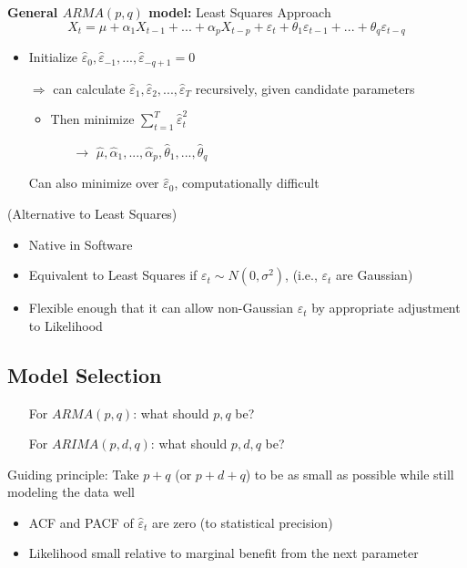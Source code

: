 \textbf{General $ARMA(p,q)$ model:} Least Squares Approach
\[
X_t=\mu+\alpha_1X_{t-1}+...+\alpha_p X_{t-p}+\varepsilon_t+\theta_1 \varepsilon_{t-1}+...+\theta_q\varepsilon_{t-q}
\]
\begin{itemize}
    \item Initialize $\hat{\varepsilon}_0, \hat{\varepsilon}_{-1},...,\hat{\varepsilon}_{-q+1}=0 $
    \item[$\Rightarrow$] can calculate $\hat{\varepsilon}_1,\hat{\varepsilon}_2,...,\hat{\varepsilon}_T $ recursively, given candidate parameters
    \begin{itemize}
        \item Then minimize $\sum_{t=1}^T\hat{\varepsilon}_t^2 $
        \begin{itemize}
            \item[$\rightarrow$] $\hat{\mu},\hat{\alpha}_1,...,\hat{\alpha}_p, \hat{\theta}_1,...,\hat{\theta}_q $
        \end{itemize}
    \end{itemize}
    \item[] Can also minimize over $\hat{\varepsilon}_0$, computationally difficult 
\end{itemize}
 \quad (Alternative to Least Squares)
\begin{itemize}
    \item Native in Software
    \item Equivalent to Least Squares if $\varepsilon_t \sim N(0,\sigma^2)$, (i.e., $\varepsilon_t$ are Gaussian)
    \item Flexible enough that it can allow non-Gaussian $\varepsilon_t$ by appropriate adjustment to Likelihood
\end{itemize}

\subsection{Model Selection}

\begin{itemize}
    \item[] For $ARMA(p,q)$: \quad what should $p,q$ be?
    \item[] For $ARIMA(p,d,q)$: \quad what should $p,d,q$ be?
\end{itemize}
Guiding principle: Take $p+q$ (or $p+d+q$) to be as small as possible while still modeling the data well
\begin{itemize}
    \item ACF and PACF of $\hat{\varepsilon}_t$ are zero (to statistical precision)
    \item Likelihood small relative to marginal benefit from the next parameter
\end{itemize}

